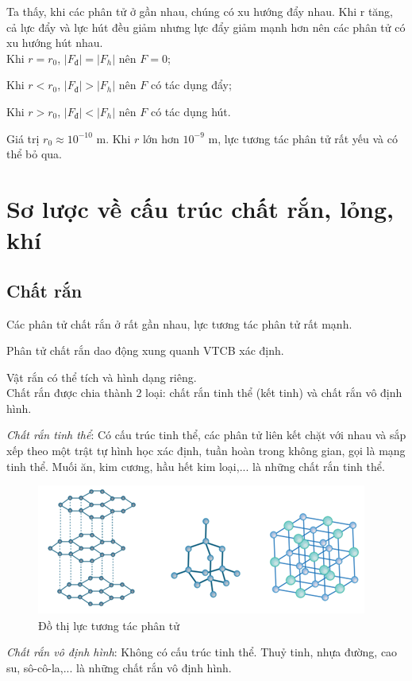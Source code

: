 \documentclass[a4paper, 12pt]{article}
\begin{document}
Ta thấy, khi các phân tử ở gần nhau, chúng có xu hướng đẩy nhau. Khi r tăng, cả lực đẩy và lực hút đều giảm nhưng lực đẩy giảm mạnh hơn nên các phân tử có xu hướng hút nhau.\\
Khi $r=r_0$, $\left|{{F_đ}}\right| = \left| {{F_h}} \right|$ nên $F=0$;

Khi $r<r_0$, $\left|{{F_đ}}\right| > \left| {{F_h}} \right|$ nên $F$ có tác dụng đẩy;

Khi $r>r_0$, $\left|{{F_đ}}\right| < \left| {{F_h}} \right|$ nên $F$ có tác dụng hút.

Giá trị ${r_0} \approx {10^{ - 10}}$ m. Khi $r$ lớn hơn $10^{-9}$ m, lực tương tác phân tử rất yếu và có thể bỏ qua.

\section{Sơ lược về cấu trúc chất rắn, lỏng, khí}
\subsection{Chất rắn}
\raisebox{0.3ex}{\tiny$\bullet$} Các phân tử chất rắn ở rất gần nhau, lực tương tác phân tử rất mạnh.

\raisebox{0.3ex}{\tiny$\bullet$} Phân tử chất rắn dao động xung quanh VTCB xác định.

\raisebox{0.3ex}{\tiny$\bullet$} Vật rắn có thể tích và hình dạng riêng.\\

Chất rắn được chia thành 2 loại: chất rắn tinh thể (kết tinh) và chất rắn vô định hình.

\textit{Chất rắn tinh thể}: Có cấu trúc tinh thể, các phân tử liên kết chặt với nhau và sắp xếp theo một trật tự hình học xác định, tuần hoàn trong không gian, gọi là mạng tinh thể. Muối ăn, kim  cương, hầu hết kim loại,... là những chất rắn tinh thể.

\begin{figure}[H]
	\centering
	\includegraphics[width=0.5\linewidth]{img/Picture5.png}
	\caption{Đồ thị lực tương tác phân tử}
\end{figure}

\textit{Chất rắn vô định hình}: Không có cấu trúc tinh thể. Thuỷ tinh, nhựa đường, cao su, sô-cô-la,... là những chất rắn vô định hình.
\end{document}
